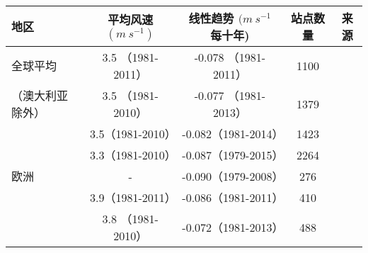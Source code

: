 \begin{table}[!htbp]
    \label{tab:globalwindtrend}
    \centering
    \small%
    \setlength{\tabcolsep}{3 pt}%
    \renewcommand{\arraystretch}{1.2}%
    \begin{tabular}{lcccc}
        \hline
        地区 & 平均风速 $(m ~ s^{-1})$ & 线性趋势 $(m ~ s^{-1} $ 每十年) & 站点数量 & 来源 \\
        \hline
        全球平均 & 3.5 （1981-2011） & -0.078 （1981-2011） & 1100 & \citet{mcvicar2012land}\\
         （澳大利亚除外）&  3.5 （1981-2010）&   -0.077 （1981-2013） & 1379 & \citet{tobin2014global}\\
         & 3.5（1981-2010）& -0.082（1981-2014）& 1423 & \citet{berrisford2015global} \\
         & 3.3（1981-2010）& -0.087（1979-2015）& 2264 & \citet{dunn2016surface} \\
         欧洲 & - & -0.090（1979-2008）& 276 & \citet{vautard2010northern} \\
          & 3.9（1981-2011）& -0.086（1981-2011）& 410 & \citet{mcvicar2012land} \\
          & 3.8 （1981-2010）& -0.072（1981-2013）& 488 & \citet{tobin2014global} \\
          \hline
    \end{tabular}
\end{table}
